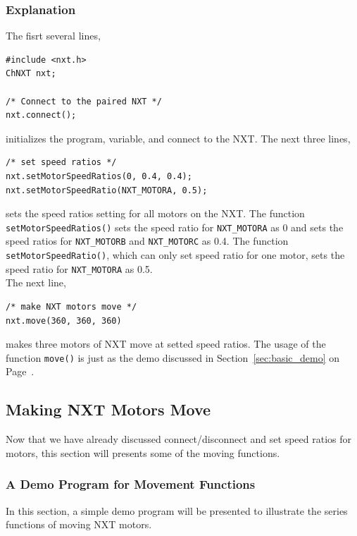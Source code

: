 \documentclass[11pt]{article}
\begin{document}
\subsubsection*{Explanation}
The fisrt several lines,
\begin{lstlisting}
#include <nxt.h>
ChNXT nxt;

/* Connect to the paired NXT */
nxt.connect();
\end{lstlisting}
initializes the program, variable, and connect to the NXT. The next three lines,
\begin{lstlisting}
/* set speed ratios */
nxt.setMotorSpeedRatios(0, 0.4, 0.4);
nxt.setMotorSpeedRatio(NXT_MOTORA, 0.5);
\end{lstlisting}
sets the speed ratios setting for all motors on the NXT. The function 
{\tt setMotorSpeedRatios()} sets the speed ratio for {\tt NXT\_MOTORA} as 0 and 
sets the speed ratios for {\tt NXT\_MOTORB} and {\tt NXT\_MOTORC} as 0.4. The 
function {\tt setMotorSpeedRatio()}, which can only set speed ratio for one motor, 
sets the speed ratio for {\tt NXT\_MOTORA} as 0.5.\\

The next line,
\begin{lstlisting}
/* make NXT motors move */
nxt.move(360, 360, 360)
\end{lstlisting}
makes three motors of NXT move at setted speed ratios. The usage of the function 
{\tt move()} is just as the demo discussed in Section~\ref{sec:basic_demo} on 
Page~\pageref{sec:basic_demo}.

\subsection{\label{sec:move_demo}Making NXT Motors Move}
Now that we have already discussed connect/disconnect and set speed ratios for 
motors, this section will presents some of the moving functions.

\subsubsection{A Demo Program for Movement Functions}
In this section, a simple demo program will be presented to illustrate the series 
functions of moving NXT motors.
\end{document}
